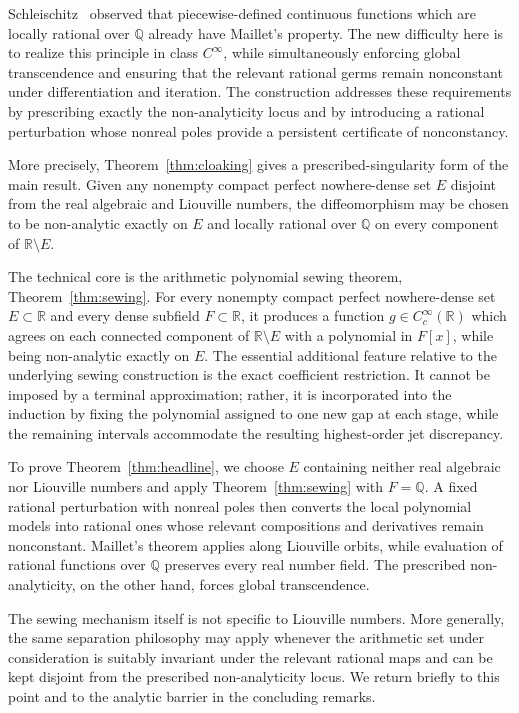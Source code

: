 \documentclass[11pt,reqno]{amsart}
\numberwithin{equation}{section}
\theoremstyle{definition}
\theoremstyle{remark}
\newcommand{\R}{\mathbb R}
\newcommand{\Q}{\mathbb Q}
\begin{document}
Schleischitz~\cite{Schleischitz2025} observed that piecewise-defined
continuous functions which are locally rational over $\Q$ already have
Maillet's property. The new difficulty here is to realize this principle in
class $C^\infty$, while simultaneously enforcing global transcendence and
ensuring that the relevant rational germs remain nonconstant under
differentiation and iteration. The construction addresses these requirements
by prescribing exactly the non-analyticity locus and by introducing a
rational perturbation whose nonreal poles provide a persistent certificate
of nonconstancy.

More precisely, Theorem~\ref{thm:cloaking} gives a
prescribed-singularity form of the main result. Given any nonempty compact
perfect nowhere-dense set $E$ disjoint from the real algebraic and Liouville
numbers, the diffeomorphism may be chosen to be non-analytic exactly on $E$
and locally rational over $\Q$ on every component of $\R\setminus E$.

The technical core is the arithmetic polynomial sewing theorem,
Theorem~\ref{thm:sewing}. For every nonempty compact perfect nowhere-dense set
$E\subset\R$ and every dense subfield $F\subset\R$, it produces a function
$g\in C_c^\infty(\R)$ which agrees on each connected component of
$\R\setminus E$ with a polynomial in $F[x]$, while being non-analytic
exactly on $E$. The essential additional feature relative to the underlying
sewing construction is the exact coefficient restriction. It cannot be
imposed by a terminal approximation; rather, it is incorporated into the
induction by fixing the polynomial assigned to one new gap at each stage,
while the remaining intervals accommodate the resulting highest-order jet
discrepancy.

To prove Theorem~\ref{thm:headline}, we choose $E$ containing neither real
algebraic nor Liouville numbers and apply Theorem~\ref{thm:sewing} with
$F=\Q$. A fixed rational perturbation with nonreal poles then converts the
local polynomial models into rational ones whose relevant compositions and
derivatives remain nonconstant. Maillet's theorem applies along Liouville
orbits, while evaluation of rational functions over $\Q$ preserves every
real number field. The prescribed non-analyticity, on the other hand,
forces global transcendence.

The sewing mechanism itself is not specific to Liouville numbers. More
generally, the same separation philosophy may apply whenever the arithmetic
set under consideration is suitably invariant under the relevant rational
maps and can be kept disjoint from the prescribed non-analyticity locus.
We return briefly to this point and to the analytic barrier in the
concluding remarks.
\end{document}
